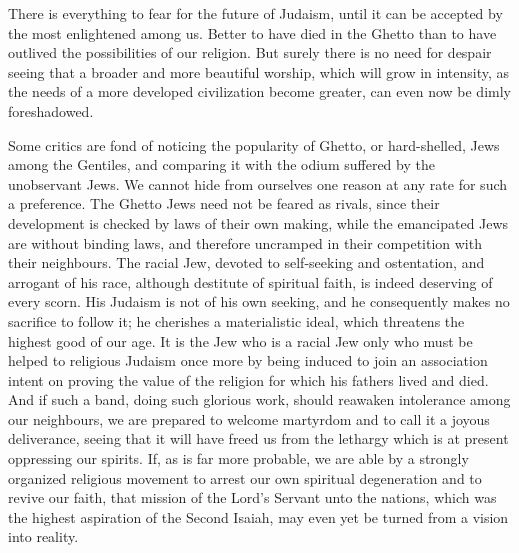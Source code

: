 There is everything to fear for the future of Judaism, 
until it can be accepted by the most enlightened among 
us. Better to have died in the Ghetto than to have outlived the possibilities of our religion. But surely there 
is no need for despair seeing that a broader and more 
beautiful worship, which will grow in intensity, as the 
needs of a more developed civilization become greater, can 
even now be dimly foreshadowed. 

Some critics are fond of noticing the popularity of Ghetto, 
or hard-shelled, Jews among the Gentiles, and comparing 
it with the odium suffered by the unobservant Jews. We 
cannot hide from ourselves one reason at any rate for such 
a preference. The Ghetto Jews need not be feared as rivals, 
since their development is checked by laws of their own 
making, while the emancipated Jews are without binding 
laws, and therefore uncramped in their competition with 
their neighbours. The racial Jew, devoted to self-seeking 
and ostentation, and arrogant of his race, although destitute of spiritual faith, is indeed deserving of every scorn. 
His Judaism is not of his own seeking, and he consequently 
makes no sacrifice to follow it; he cherishes a materialistic 
ideal, which threatens the highest good of our age. It is 
the Jew who is a racial Jew only who must be helped 
to religious Judaism once more by being induced to join 
an association intent on proving the value of the religion 
for which his fathers lived and died. And if such a band, 
doing such glorious work, should reawaken intolerance 
among our neighbours, we are prepared to welcome martyrdom and to call it a joyous deliverance, seeing that 
it will have freed us from the lethargy which is at present 
oppressing our spirits. If, as is far more probable, we are 
able by a strongly organized religious movement to arrest 
our own spiritual degeneration and to revive our faith, that 
mission of the Lord's Servant unto the nations, which was 
the highest aspiration of the Second Isaiah, may even yet 
be turned from a vision into reality. 


